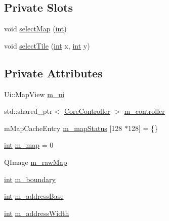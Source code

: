 \subsection*{Private Slots}
\begin{DoxyCompactItemize}
\item 
void \mbox{\hyperlink{class_q_g_b_a_1_1_map_view_ad51a1de9d54f8ef9203ac28706cf3727}{select\+Map}} (\mbox{\hyperlink{ioapi_8h_a787fa3cf048117ba7123753c1e74fcd6}{int}})
\item 
void \mbox{\hyperlink{class_q_g_b_a_1_1_map_view_a562f195c2a34eb5f07be9f0d865e7d06}{select\+Tile}} (\mbox{\hyperlink{ioapi_8h_a787fa3cf048117ba7123753c1e74fcd6}{int}} x, \mbox{\hyperlink{ioapi_8h_a787fa3cf048117ba7123753c1e74fcd6}{int}} y)
\end{DoxyCompactItemize}
\subsection*{Private Attributes}
\begin{DoxyCompactItemize}
\item 
Ui\+::\+Map\+View \mbox{\hyperlink{class_q_g_b_a_1_1_map_view_ac5b0bf3362a89a38ed984fb7a40eac2a}{m\+\_\+ui}}
\item 
std\+::shared\+\_\+ptr$<$ \mbox{\hyperlink{class_q_g_b_a_1_1_core_controller}{Core\+Controller}} $>$ \mbox{\hyperlink{class_q_g_b_a_1_1_map_view_ab7390e3e313a05633eb247462f819389}{m\+\_\+controller}}
\item 
m\+Map\+Cache\+Entry \mbox{\hyperlink{class_q_g_b_a_1_1_map_view_ac15a1278bc7c269b33a8f44d6033d5e3}{m\+\_\+map\+Status}} \mbox{[}128 $\ast$128\mbox{]} = \{\}
\item 
\mbox{\hyperlink{ioapi_8h_a787fa3cf048117ba7123753c1e74fcd6}{int}} \mbox{\hyperlink{class_q_g_b_a_1_1_map_view_a57a4d955c9618326e5c9fcd7e2a87c27}{m\+\_\+map}} = 0
\item 
Q\+Image \mbox{\hyperlink{class_q_g_b_a_1_1_map_view_a19a56809355bf2a41ee54af5d36f2f24}{m\+\_\+raw\+Map}}
\item 
\mbox{\hyperlink{ioapi_8h_a787fa3cf048117ba7123753c1e74fcd6}{int}} \mbox{\hyperlink{class_q_g_b_a_1_1_map_view_ac259591cbe9cc68004a3fbc71c07ece5}{m\+\_\+boundary}}
\item 
\mbox{\hyperlink{ioapi_8h_a787fa3cf048117ba7123753c1e74fcd6}{int}} \mbox{\hyperlink{class_q_g_b_a_1_1_map_view_a85204eb6bbc262f29325e86d6f60a5dc}{m\+\_\+address\+Base}}
\item 
\mbox{\hyperlink{ioapi_8h_a787fa3cf048117ba7123753c1e74fcd6}{int}} \mbox{\hyperlink{class_q_g_b_a_1_1_map_view_a82f59af40966f92a4b8ce99d298a886a}{m\+\_\+address\+Width}}
\end{DoxyCompactItemize}
